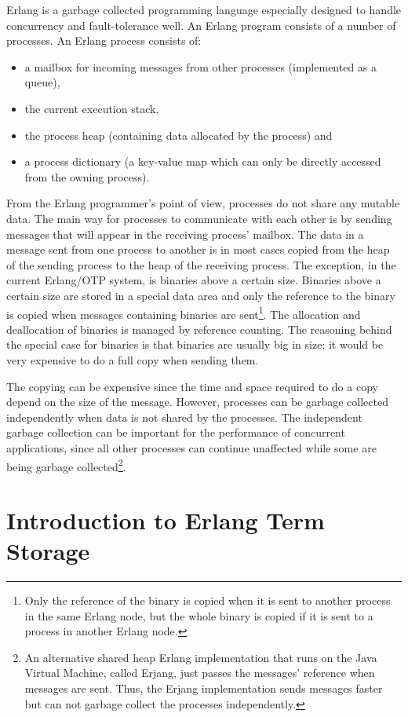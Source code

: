 \documentclass[aps,pre,preprint,nofootinbib]{revtex4}
\begin{document}
Erlang is a garbage collected programming language especially designed to handle concurrency and fault-tolerance well.
An Erlang program consists of a number of processes.
An Erlang process consists of: 
\begin{itemize}
 \item a mailbox for incoming messages from other processes (implemented as a queue),
 \item the current execution stack,
 \item the process heap (containing data allocated by the process) and
 \item a process dictionary (a key-value map which can only be directly accessed from the owning process).
\end{itemize}
From the Erlang programmer's point of view, processes do not share any mutable data.
The main way for processes to communicate with each other is by sending messages that will appear in the receiving process' mailbox.
The data in a message sent from one process to another is in most cases copied from the heap of the sending process to the heap of the receiving process.
The exception, in the current Erlang/OTP system, is binaries above a certain size.
Binaries above a certain size are stored in a special data area and only the reference to the binary is copied when messages containing binaries are sent\footnote{Only the reference of the binary is copied when it is sent to another process in the same Erlang node, but the whole binary is copied if it is sent to a process in another Erlang node.}.
The allocation and deallocation of binaries is managed by reference counting.
The reasoning behind the special case for binaries is that binaries are usually big in size; it would be very expensive to do a full copy when sending them.

The copying can be expensive since the time and space required to do a copy depend on the size of the message.
However, processes can be garbage collected independently when data is not shared by the processes.
The independent garbage collection can be important for the performance of concurrent applications, since all other processes can continue unaffected while some are being garbage collected\footnote{
An alternative shared heap Erlang implementation that runs on the Java Virtual Machine, called Erjang, just passes the messages' reference when messages are sent.
Thus, the Erjang implementation sends messages faster but can not garbage collect the processes independently.}.

\section{Introduction to Erlang Term Storage}\label{sec:ets_introduction}
\end{document}
